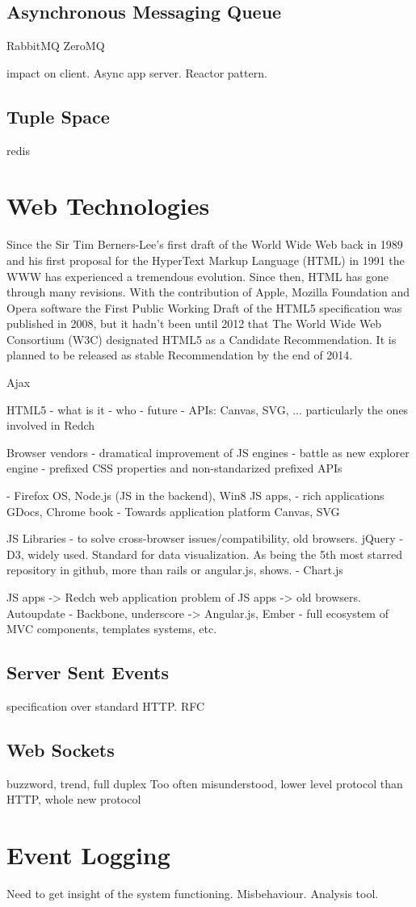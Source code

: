 \subsection{Asynchronous Messaging Queue}
RabbitMQ
ZeroMQ

impact on client. Async app server. Reactor pattern.

\subsection{Tuple Space}
redis

\section{Web Technologies}

Since the Sir Tim Berners-Lee's first draft of the World Wide Web back in 1989 and his first proposal for the HyperText Markup Language (HTML) \cite{HTMLtags} in 1991 the WWW has experienced a tremendous evolution. Since then, HTML has gone through many revisions. With the contribution of Apple, Mozilla Foundation and Opera software the First Public Working Draft of  the HTML5 specification was published in 2008, but it hadn't been until 2012 that The World Wide Web Consortium (W3C) designated HTML5 as a Candidate Recommendation. It is planned to be released as stable Recommendation by the end of 2014.


Ajax

HTML5	
	- what is it
	- who
	- future
	- APIs: Canvas, SVG, ... particularly the ones involved in Redch

Browser vendors
	- dramatical improvement of JS engines
	- battle as new explorer engine
	- prefixed CSS properties and non-standarized prefixed APIs

	- Firefox OS, Node.js (JS in the backend), Win8 JS apps, 
	- rich applications GDocs, Chrome book
	- Towards application platform
Canvas, SVG

JS Libraries
	- to solve cross-browser issues/compatibility, old browsers. jQuery
	- D3, widely used. Standard for data visualization. As being the 5th most starred repository in github, more than rails or angular.js, shows.
	- Chart.js

	JS apps -> Redch web application 
	problem of JS apps -> old browsers. Autoupdate
	- Backbone, underscore -> Angular.js, Ember
	- full ecosystem of MVC components, templates systems, etc.

\subsection{Server Sent Events}
specification over standard HTTP. RFC

\subsection{Web Sockets}
buzzword, trend, full duplex
Too often misunderstood, lower level protocol than HTTP, whole new protocol

\section{Event Logging}
Need to get insight of the system functioning. Misbehaviour. Analysis tool.